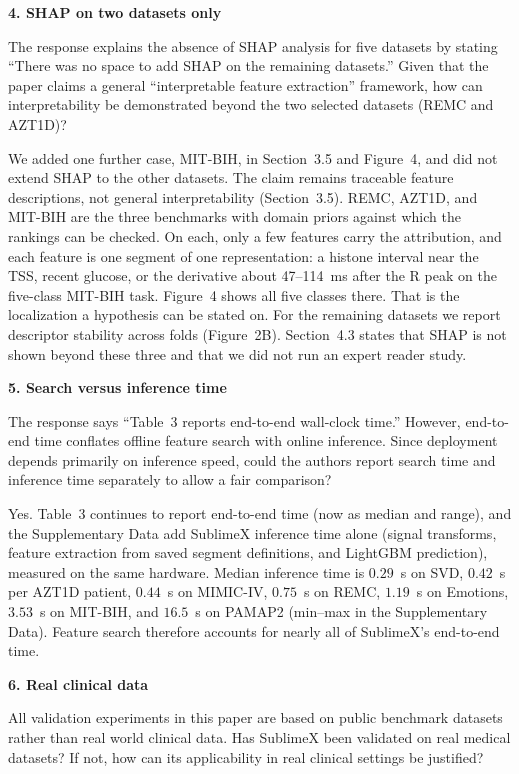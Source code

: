\documentclass[11pt]{article}
\makeatletter
\newcommand{\rsp}{\par\vspace{0.9em}}
\newcommand{\rcitem}[2]{\begin{reviewerbox}\textbf{#1}\par\smallskip#2\end{reviewerbox}}
\newcommand{\response}[2]{%
  \begin{responsebox}#1%
  \def\@responseitems{#2}%
  \ifx\@responseitems\empty\else\begin{itemize}[nosep,leftmargin=1.2em]#2\end{itemize}\fi
  \end{responsebox}\rsp}
\makeatother
\begin{document}
\rcitem{4. SHAP on two datasets only}{The response explains the absence of SHAP analysis for five
datasets by stating ``There was no space to add SHAP on the remaining datasets.'' Given that the paper
claims a general ``interpretable feature extraction'' framework, how can interpretability be
demonstrated beyond the two selected datasets (REMC and AZT1D)?}

\response{We added one further case, MIT-BIH, in Section~3.5 and Figure~4, and did not extend SHAP
to the other datasets. The claim remains traceable feature descriptions, not general
interpretability (Section~3.5). REMC, AZT1D, and MIT-BIH are the three benchmarks with domain
priors against which the rankings can be checked. On each, only a few features carry the
attribution, and each feature is one segment of one representation: a histone interval near the
TSS, recent glucose, or the derivative about 47--114~ms after the R peak on the five-class
MIT-BIH task. Figure~4 shows all five classes there. That is the localization a hypothesis can be stated on. For the remaining datasets we
report descriptor stability across folds (Figure~2B). Section~4.3 states that SHAP is not shown
beyond these three and that we did not run an expert reader study.}{}

\rcitem{5. Search versus inference time}{The response says ``Table~3 reports end-to-end wall-clock
time.'' However, end-to-end time conflates offline feature search with online inference. Since
deployment depends primarily on inference speed, could the authors report search time and inference
time separately to allow a fair comparison?}

\response{Yes. Table~3 continues to report end-to-end time (now as median and range), and the
Supplementary Data add SublimeX inference time alone (signal transforms, feature extraction from saved
segment definitions, and LightGBM prediction), measured on the same hardware. Median inference
time is $0.29$~s on SVD, $0.42$~s per AZT1D patient, $0.44$~s on MIMIC-IV, $0.75$~s on REMC,
$1.19$~s on Emotions, $3.53$~s on MIT-BIH, and $16.5$~s on PAMAP2 (min--max in the Supplementary
Data). Feature search therefore accounts for nearly all of SublimeX's end-to-end time.}{}

\rcitem{6. Real clinical data}{All validation experiments in this paper are based on public benchmark
datasets rather than real world clinical data. Has SublimeX been validated on real medical datasets?
If not, how can its applicability in real clinical settings be justified?}
\end{document}
